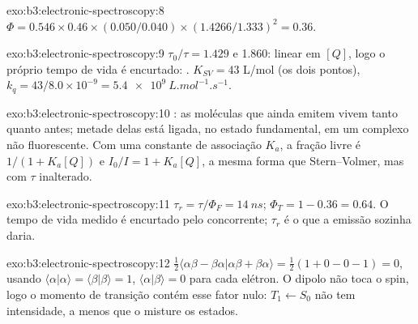 \begin{solution}{exo:b3:electronic-spectroscopy:8}
$\Phi = 0.546 \times 0.46 \times (0.050/0.040) \times (1.4266/1.333)^2 = 0.36$.
\end{solution}

\begin{solution}{exo:b3:electronic-spectroscopy:9}
$\tau_0/\tau = 1.429$ e 1.860: linear em $[Q]$, logo o próprio tempo de vida é
encurtado: . $K_{SV} = 43$ L/mol (os dois pontos), $k_q = 43/8.0
\times 10^{-9} = \qty{5.4e9}{L.mol^{-1}.s^{-1}}$.
\end{solution}

\begin{solution}{exo:b3:electronic-spectroscopy:10}
: as moléculas que ainda emitem vivem tanto quanto antes; metade
delas está ligada, no estado fundamental, em um complexo não fluorescente. Com uma
constante de associação $K_a$, a fração livre é $1/(1 + K_a[Q])$ e $I_0/I = 1 +
K_a[Q]$, a mesma forma que Stern--Volmer, mas com $\tau$ inalterado.
\end{solution}

\begin{solution}{exo:b3:electronic-spectroscopy:11}
$\tau_r = \tau/\Phi_F = \qty{14}{ns}$; $\Phi_T = 1 - 0.36 = 0.64$. O tempo de vida medido é
encurtado pelo  concorrente; $\tau_r$ é o que a emissão
sozinha daria.
\end{solution}

\begin{solution}{exo:b3:electronic-spectroscopy:12}
$\frac12\langle\alpha\beta - \beta\alpha|\alpha\beta + \beta\alpha\rangle = \frac12(1 + 0 - 0 - 1) = 0$, usando
$\langle\alpha|\alpha\rangle = \langle\beta|\beta\rangle = 1$, $\langle\alpha|\beta\rangle = 0$ para cada elétron.
O  dipolo não toca o spin, logo o momento de transição contém esse fator
nulo: $T_1 \leftarrow S_0$ não tem intensidade, a menos que o 
misture os estados.
\end{solution}

